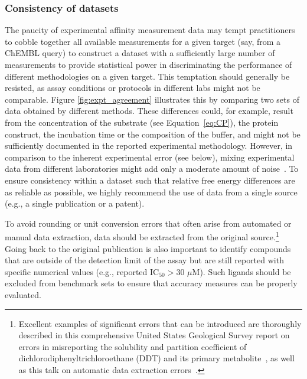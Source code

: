 \documentclass[9pt,bestpractices]{livecoms}
\begin{document}
\subsubsection{Consistency of datasets}
The paucity of experimental affinity measurement data may tempt practitioners to cobble together all available measurements for a given target (say, from a ChEMBL query) to construct a dataset with a sufficiently large number of measurements to provide statistical power in discriminating the performance of different methodologies on a given target.
This temptation should generally be resisted, as assay conditions or protocols in different labs might not be comparable. Figure \ref{fig:expt_agreement} illustrates this by comparing two sets of data obtained by different methods.
% 
These differences could, for example, result from the concentration of the substrate (see Equation~\ref{eq:CP}), the protein construct, the incubation time or the composition of the buffer, and might not be sufficiently documented in the reported experimental methodology. However, in comparison to the inherent experimental error (see below), mixing experimental data from different laboratories might add only a moderate amount of noise~\cite{kalliokoski_comparability_2013}.
To ensure consistency within a dataset such that relative free energy differences are as reliable as possible, we highly recommend the use of data from a single source (e.g., a single publication or a patent).

To avoid rounding or unit conversion errors that often arise from automated or manual data extraction, data should be extracted from the original source.\footnote{Excellent examples of significant errors that can be introduced are thoroughly described in this comprehensive United States Geological Survey report on errors in misreporting the solubility and partition coefficient of dichlorodiphenyltrichloroethane (DDT) and its primary metabolite~\cite{pontolillo2001search}, as well as this talk on automatic data extraction errors~\cite{daga_pankaj_r_2019_3445476}.}
Going back to the original publication is also important to identify compounds that are outside of the detection limit of the assay but are still reported with specific numerical values (e.g., reported IC$_{50} > 30 \,\,\mu$M). Such ligands should be excluded from benchmark sets to ensure that accuracy measures can be properly evaluated.
\end{document}
